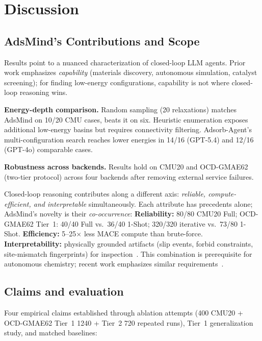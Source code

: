 \section{Discussion}

\subsection{AdsMind's Contributions and Scope}

Results point to a nuanced characterization of closed-loop LLM agents.
Prior work emphasizes \textit{capability} (materials discovery, autonomous simulation, catalyst screening); for finding low-energy configurations, capability is not where closed-loop reasoning wins.

\textbf{Energy-depth comparison.}
Random sampling (20 relaxations) matches AdsMind on 10/20 CMU cases, beats it on six.
Heuristic enumeration exposes additional low-energy basins but requires connectivity filtering.
Adsorb-Agent's multi-configuration search reaches lower energies in 14/16 (GPT-5.4) and 12/16 (GPT-4o) comparable cases.

\textbf{Robustness across backends.}
Results hold on CMU20 and OCD-GMAE62 (two-tier protocol) across four backends after removing external service failures.

Closed-loop reasoning contributes along a different axis: \textit{reliable, compute-efficient, and interpretable} simultaneously.
Each attribute has precedents alone; AdsMind's novelty is their \textit{co-occurrence}:
\textbf{Reliability:} 80/80 CMU20 Full; OCD-GMAE62 Tier~1: 40/40 Full vs.\ 36/40 1-Shot; 320/320 iterative vs.\ 73/80 1-Shot.
\textbf{Efficiency:} 5--25$\times$ less MACE compute than brute-force.
\textbf{Interpretability:} physically grounded artifacts (slip events, forbid constraints, site-mismatch fingerprints) for inspection~\cite{zhang2026matclaw,huang2026towards}.
This combination is prerequisite for autonomous chemistry; recent work emphasizes similar requirements~\cite{zhang2026towards,yang2026quasar}.



\subsection{Claims and evaluation}

Four empirical claims established through ablation attempts (400 CMU20 + OCD-GMAE62 Tier~1 1240 + Tier~2 720 repeated runs), Tier~1 generalization study, and matched baselines:

